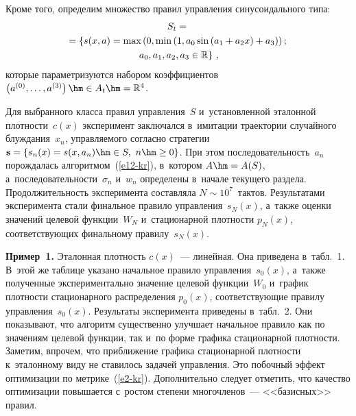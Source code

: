 \begin{multicols}{2}
  Кроме того, определим множество правил управ\-ле\-ния синусоидального 
типа:
  \begin{multline*}
  S_t={}\\
  \hspace*{-1.35pt}{}=\left\{ s(x,a)=\max \left( 0,\min \left( 1, a_0 \sin\left( 
a_1+a_2x\right)+a_3\right)\right);\right.\\
 \left.a_0, a_1, a_2, a_3 \in \mathbb{R}\right\}\,,
\end{multline*}
которые параметризуются набором коэффициентов $\left( a^{(0)}, \ldots , 
a^{(3)}\right) \hm\in A_t\hm= \mathbb{R}^4$.
  
  Для выбранного класса правил управ\-ле\-ния~$S$ и~установленной 
эталонной плот\-ности~$c(x)$ эксперимент заключался в~имитации траектории 
случайного блуж\-да\-ния~$x_n$, управ\-ля\-емо\-го согласно стратегии $\mathbf{s}=\{ 
s_n(x)=s(x, a_n)\hm\in S,\ n\hm\geq 0\}$. При этом последо\-ва\-тель\-ность~$a_n$ 
порождалась алгоритмом~(\ref{e12-kr}), в~котором $A\hm= A(S)$, 
а~последовательности~$\sigma_n$ и~$w_n$ определены в~начале текущего 
раздела. Продолжительность эксперимента составляла $N\sim 10^7$~тактов. 
Результатами эксперимента стали финальное правило управ\-ле\-ния~$s_N(x)$, 
а~так\-же оценки значений целевой функции~$W_N$ и~стационарной 
плотности $p_N(x)$, соответствующих финальному правилу~$s_N(x)$.
  
  \smallskip
  
  \noindent
  \textbf{Пример~1.} Эталонная плот\-ность $c(x)$~--- линейная. Она 
приведена в~табл.~1. В~этой же таб\-ли\-це указано начальное правило 
управления~$s_0(x)$, а~так\-же полученные экспериментально значение 
целевой функции~$W_0$ и~график плот\-ности стационарного распределения 
$p_0(x)$, соответствующие правилу управ\-ле\-ния~$s_0(x)$. Результаты 
эксперимента приведены в~табл.~2. Они показывают, что алгоритм 
существенно улучшает начальное правило как по значениям целевой 
функции, так и~по форме графика стационарной плот\-ности. Заметим, 
впрочем, что при\-бли\-же\-ние графика стационарной
 плотности к~эталонному 
виду не ставилось задачей управ\-ле\-ния. Это побочный эффект оптимизации 
по мет\-ри\-ке~(\ref{e2-kr}). Дополнительно следует отметить, что качество 
оптимизации повышается с~рос\-том степени многочленов~--- <<базисных>> 
правил. %

\pagebreak

\end{multicols}

